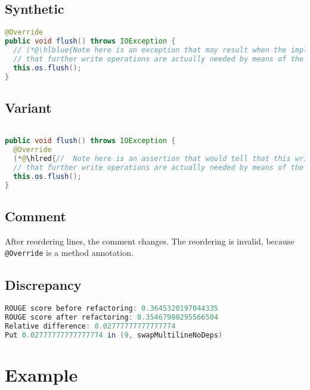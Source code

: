 \documentclass[11pt]{article}
\DeclareRobustCommand{\hlred}[1]{{\sethlcolor{YellowOrange}\hl{#1}}}
\DeclareRobustCommand{\hlblue}[1]{{\sethlcolor{SeaGreen}\hl{#1}}}
\DeclareRobustCommand{\hlblue}[1]{{\sethlcolor{SkyBlue}\hl{#1}}}
\begin{document}
\subsection{Synthetic}

\begin{lstlisting}[language=java]
@Override
public void flush() throws IOException {
  // (*@\hlblue{Note here is an exception that may result when the implementation checks whether and if the operation succeeds to}@*)
  // that further write operations are actually needed by means of the isOverflown() method.
  this.os.flush();
}
\end{lstlisting}

\subsection{Variant}

\begin{lstlisting}[language=java]

public void flush() throws IOException {
  @Override
  (*@\hlred{//  Note here is an assertion that would tell that this writer knows now as is in case we detect}@*)
  // that further write operations are actually needed by means of the isOverflown() method.
  this.os.flush();
}
\end{lstlisting}
\subsection{Comment}

After reordering lines, the comment changes. The reordering is invalid, because \texttt{@Override} is a method annotation.

\subsection{Discrepancy}

\begin{lstlisting}[language=java]
ROUGE score before refactoring: 0.3645320197044335
ROUGE score after refactoring: 0.35467980295566504
Relative difference: 0.02777777777777774
Put 0.02777777777777774 in (9, swapMultilineNoDeps)
\end{lstlisting}





\pagebreak
\section{Example}
\end{document}
